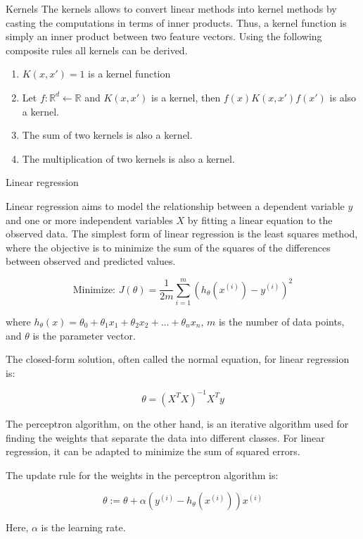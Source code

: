 \documentclass{beamer}
\begin{document}
\begin{frame}
\begin{columns}
\begin{column}{0.3\textwidth}
\begin{block}{Kernels}
The kernels allows to convert linear methods into kernel methods by casting the computations in terms of inner products. Thus, a kernel function is simply an inner product between two feature vectors. Using the following composite rules all kernels can be derived.

\begin{enumerate}
    \item $K(x, x') = 1$ is a kernel function
    \item Let $f : \mathbb{R}^d \leftarrow  \mathbb{R}$ and $K(x, x')$ is a kernel, then $f(x)K(x, x')f(x')$ is also a kernel.
    \item The sum of two kernels is also a kernel.
    \item The multiplication of two kernels is also a kernel.
\end{enumerate}

\end{block}

\begin{block}{Linear regression}

Linear regression aims to model the relationship between a dependent variable $y$ and one or more independent variables $X$ by fitting a linear equation to the observed data. The simplest form of linear regression is the least squares method, where the objective is to minimize the sum of the squares of the differences between observed and predicted values.

\[
\text{Minimize: } J(\theta) = \frac{1}{2m} \sum_{i=1}^{m} (h_\theta(x^{(i)}) - y^{(i)})^2
\]

where $h_\theta(x) = \theta_0 + \theta_1 x_1 + \theta_2 x_2 + \ldots + \theta_n x_n$, $m$ is the number of data points, and $\theta$ is the parameter vector.

The closed-form solution, often called the normal equation, for linear regression is:

\[
\theta = (X^T X)^{-1} X^T y
\]

The perceptron algorithm, on the other hand, is an iterative algorithm used for finding the weights that separate the data into different classes. For linear regression, it can be adapted to minimize the sum of squared errors.

The update rule for the weights in the perceptron algorithm is:

\[
\theta := \theta + \alpha(y^{(i)} - h_\theta(x^{(i)})) x^{(i)}
\]

Here, $\alpha$ is the learning rate.


\end{block}
\end{column}
\end{columns}
\end{frame}
\end{document}
